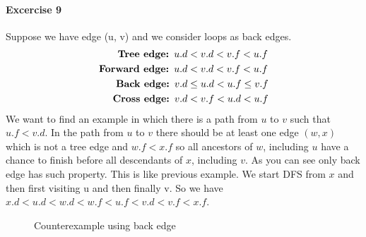 \documentclass{book}
\begin{document}
	\paragraph{Excercise 9}
	Suppose we have edge (u, v) and we consider loops as back edges.
	\begin{align*}	
	\begin{split}
	\text{\textbf{Tree edge: }} u.d &< v.d < v.f < u.f \\
	\text{\textbf{Forward edge: }} u.d &< v.d < v.f < u.f \\
	\text{\textbf{Back edge: }} v.d &\le u.d < u.f \le v.f \\
	\text{\textbf{Cross edge: }} v.d &< v.f < u.d < u.f \\
	\end{split}
	\end{align*}
	We want to find an example in which there is a path from $u$ to $v$ such that $u.f < v.d$. In the path from $u$ to $v$ there should be at least one edge $(w, x)$ which is not a tree edge and $w.f < x.f$ so all ancestors of $w$, including $u$ have a chance to finish before all  descendants of $x$, including $v$. As you can see only back edge has such property. This is like previous example. We start DFS from $x$ and then first visiting u and then finally v. So we have $x.d < u.d < w.d < w.f < u.f < v.d < v.f < x.f$.
	
	\begin{figure}[h!]
		\centering
		\caption{Counterexample using back edge}
					\end{figure}	
	
	\FloatBarrier
\end{document}
